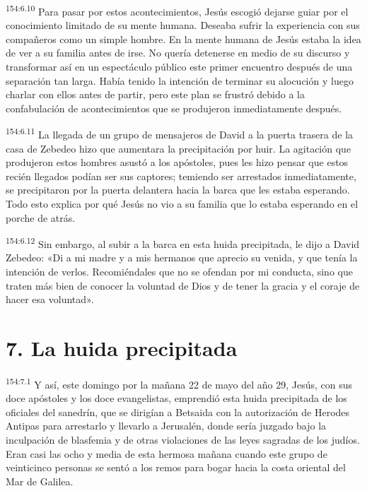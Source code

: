 \par
\textsuperscript{154:6.10} Para pasar por estos acontecimientos, Jesús escogió dejarse guiar por el conocimiento limitado de su mente humana. Deseaba sufrir la experiencia con sus compañeros como un simple hombre. En la mente humana de Jesús estaba la idea de ver a su familia antes de irse. No quería detenerse en medio de su discurso y transformar así en un espectáculo público este primer encuentro después de una separación tan larga. Había tenido la intención de terminar su alocución y luego charlar con ellos antes de partir, pero este plan se frustró debido a la confabulación de acontecimientos que se produjeron inmediatamente después.

\par
\textsuperscript{154:6.11} La llegada de un grupo de mensajeros de David a la puerta trasera de la casa de Zebedeo hizo que aumentara la precipitación por huir. La agitación que produjeron estos hombres asustó a los apóstoles, pues les hizo pensar que estos recién llegados podían ser sus captores; temiendo ser arrestados inmediatamente, se precipitaron por la puerta delantera hacia la barca que les estaba esperando. Todo esto explica por qué Jesús no vio a su familia que lo estaba esperando en el porche de atrás.

\par
\textsuperscript{154:6.12} Sin embargo, al subir a la barca en esta huida precipitada, le dijo a David Zebedeo: «Di a mi madre y a mis hermanos que aprecio su venida, y que tenía la intención de verlos. Recomiéndales que no se ofendan por mi conducta, sino que traten más bien de conocer la voluntad de Dios y de tener la gracia y el coraje de hacer esa voluntad».

\section*{7. La huida precipitada}
\par
\textsuperscript{154:7.1} Y así, este domingo por la mañana 22 de mayo del año 29, Jesús, con sus doce apóstoles y los doce evangelistas, emprendió esta huida precipitada de los oficiales del sanedrín, que se dirigían a Betsaida con la autorización de Herodes Antipas para arrestarlo y llevarlo a Jerusalén, donde sería juzgado bajo la inculpación de blasfemia y de otras violaciones de las leyes sagradas de los judíos. Eran casi las ocho y media de esta hermosa mañana cuando este grupo de veinticinco personas se sentó a los remos para bogar hacia la costa oriental del Mar de Galilea.

